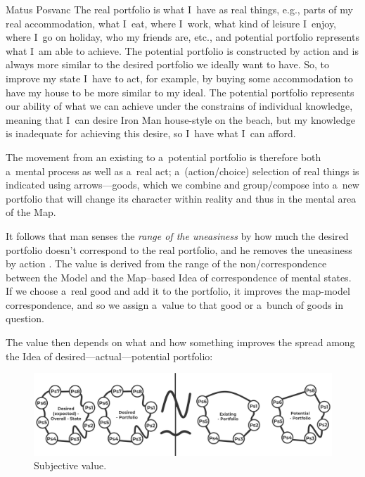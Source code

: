\begin{artengenv}{Matus Posvanc}
The real portfolio is what I~have as real things, e.g., parts of my real accommodation, what I~eat, where I~work, what kind of leisure I~enjoy, where I~go on holiday, who my friends are, etc., and potential portfolio represents what I~am able to achieve. The potential portfolio is constructed by action and is always more similar to the desired portfolio we ideally want to have. So, to improve my state I~have to act, for example, by buying some accommodation to have my house to be more similar to my ideal. The potential portfolio represents our ability of what we can achieve under the constrains of individual knowledge, meaning that I~can desire Iron Man house-style on the beach, but my knowledge is inadequate for achieving this desire, so I~have what I~can afford.



The movement from an existing to a~potential portfolio is therefore both a~mental process as well as a~real act; a~(action/choice) selection of real things is indicated using arrows---goods, which we combine and group/compose into a~new portfolio that will change its character within reality and thus in the mental area of the Map.



It follows that man senses the \textit{range of the uneasiness} by how much the desired portfolio doesn't correspond to the real portfolio, and he removes the uneasiness by action 
\parencite[compare to][sec.5.69 and 5.70]{Hayek1952Sensory}. %
 The value is derived from the range of the non/correspondence between the Model and the Map–based Idea of correspondence of mental states. If we choose a~real good and add it to the portfolio, it improves the map-model correspondence, and so we assign a~value to that good or a~bunch of goods in question.



The value then depends on what and how something improves the spread among the Idea of desired---actual---potential portfolio:


\begin{figure}
 \begin{center}
 \includegraphics[width=.99\textwidth]{ART_Posvanc/Illustration3_PU.pdf}%
 \end{center}%
 \caption{Subjective value.}\label{pos:fig3}
\end{figure}




\end{artengenv}
